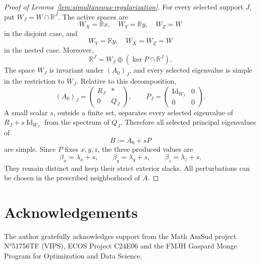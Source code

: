 \documentclass[11pt,a4paper]{article}
\theoremstyle{definition}
\newcommand{\R}{\mathbb R}
\newcommand{\Id}{\operatorname{Id}}
\begin{document}
\begin{proof}[Proof of Lemma~\ref{lem:simultaneous-regularization}]
For every selected support $J$, put $W_J=W\cap\R^J$. The active spaces
are
$$
W_X=\R x,\quad W_Y=\R y,\quad W_Z=W
$$
in the disjoint case, and
$$
W_Y=\R y,\quad W_X=W_Z=W
$$
in the nested case. Moreover,
$$
\R^J=W_J\oplus(\ker P\cap\R^J).
$$
The space $W_J$ is invariant under $(A_0)_J$, and every selected
eigenvalue is simple in the restriction to $W_J$. Relative to this
decomposition,
$$
(A_0)_J=
\begin{pmatrix}
R_J&*\\
0&Q_J
\end{pmatrix},
\qquad
P_J=
\begin{pmatrix}
\Id_{W_J}&0\\
0&0
\end{pmatrix}.
$$
A small scalar $s$, outside a finite set, separates every selected
eigenvalue of $R_J+s\Id_{W_J}$ from the spectrum of $Q_J$. Therefore
all selected principal eigenvalues of
$$
B:=A_0+sP
$$
are simple. Since $P$ fixes $x,y,z$, the three produced values are
$$
\beta_x=\lambda_x+s,
\qquad
\beta_y=\lambda_y+s,
\qquad
\beta_z=\lambda_z+s.
$$
They remain distinct and keep their strict exterior slacks. All
perturbations can be chosen in the prescribed neighborhood of $A$.
\end{proof}

\section*{Acknowledgements}
The author gratefully acknowledges support from the Math AmSud project N°51756TF (VIPS), ECOS Project C24E06 and the FMJH Gaspard Monge Program for Optimization and Data Science.
\end{document}
